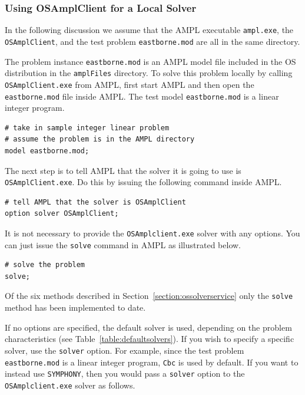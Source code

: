\documentclass[11pt]{article}
\renewcommand{\_}{{\char"5F}}
\renewcommand{\{}{{\char"7B}}
\renewcommand{\}}{{\char"7D}}
\renewcommand{\^}{{\char"0D}}
\renewcommand{\'}{{\char"0D}}
\begin{document}
\begin{enumerate}[Step 1:]
\subsubsection{Using OSAmplClient for a Local Solver}\label{section:localampl}

In the following discussion we assume that the AMPL executable {\tt ampl.exe}, the {\tt OSAmplClient},  
and the test problem {\tt  eastborne.mod}
 are all in the same directory.  

The  problem instance {\tt eastborne.mod} is an AMPL model file included in the OS distribution 
in the {\tt amplFiles} directory.  To solve this problem locally 
by calling {\tt OSAmplClient.exe} from AMPL, first start AMPL and then open the {\tt eastborne.mod} file 
inside AMPL.  The test model {\tt eastborne.mod} is a linear integer program. 

\begin{verbatim}
# take in sample integer linear problem
# assume the problem is in the AMPL directory
model eastborne.mod;
\end{verbatim}

The next step is to tell AMPL that the solver it is going to use is {\tt OSAmplClient.exe}. 
Do this by issuing the following command inside AMPL.

\begin{verbatim}
# tell AMPL that the solver is OSAmplClient
option solver OSAmplClient;
\end{verbatim}

It is not necessary to provide the  {\tt OSAmplclient.exe} solver with any options. 
You can just issue the {\tt solve} command in AMPL as illustrated below.  

\begin{verbatim}
# solve the problem
solve;
\end{verbatim}

Of the six methods described in Section~\ref{section:ossolverservice} only the {\tt solve} method 
has been implemented to date.

If no options are specified, the default solver is used, depending on the problem characteristics 
(see Table~\ref{table:defaultsolvers}).
If you wish to specify a specific solver, use the {\tt solver} option.   For example,  
since the test problem {\tt eastborne.mod} is a linear integer program, {\tt Cbc} is used by default. 
If you want to instead use {\tt SYMPHONY},
then you would pass a {\tt solver} option to the {\tt OSAmplclient.exe} solver as follows.%


\end{enumerate}
\end{document}

